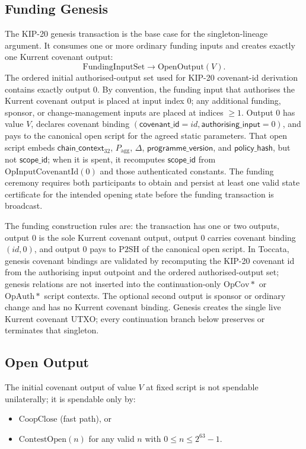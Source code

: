 \documentclass[10pt,a4paper]{article}
\begin{document}
\subsection{Funding Genesis}
The KIP-20 genesis transaction is the base case for the singleton-lineage argument. It consumes one or more ordinary funding inputs and creates exactly one Kurrent covenant output:
\[
  \mathrm{FundingInputSet} \longrightarrow \mathrm{OpenOutput}(V).
\]
The ordered initial authorised-output set used for KIP-20 covenant-id derivation contains exactly output 0. By convention, the funding input that authorises the Kurrent covenant output is placed at input index 0; any additional funding, sponsor, or change-management inputs are placed at indices $\ge 1$. Output 0 has value $V$, declares covenant binding $(\mathsf{covenant\_id}=id,\mathsf{authorising\_input}=0)$, and pays to the canonical open script for the agreed static parameters. That open script embeds $\mathsf{chain\_context}_{32}$, $P_{\mathrm{agg}}$, $\Delta$, $\mathsf{programme\_version}$, and $\mathsf{policy\_hash}$, but not $\mathsf{scope\_id}$; when it is spent, it recomputes $\mathsf{scope\_id}$ from $\mathrm{OpInputCovenantId}(0)$ and those authenticated constants. The funding ceremony requires both participants to obtain and persist at least one valid state certificate for the intended opening state before the funding transaction is broadcast.

The funding construction rules are: the transaction has one or two outputs, output 0 is the sole Kurrent covenant output, output 0 carries covenant binding $(id,0)$, and output 0 pays to $\mathrm{P2SH}$ of the canonical open script. In Toccata, genesis covenant bindings are validated by recomputing the KIP-20 covenant id from the authorising input outpoint and the ordered authorised-output set; genesis relations are not inserted into the continuation-only $\mathrm{OpCov*}$ or $\mathrm{OpAuth*}$ script contexts. The optional second output is sponsor or ordinary change and has no Kurrent covenant binding. Genesis creates the single live Kurrent covenant UTXO; every continuation branch below preserves or terminates that singleton.

\subsection{Open Output}
The initial covenant output of value $V$ at fixed script is not spendable unilaterally; it is spendable only by:
\begin{itemize}
  \item $\mathrm{CoopClose}$ (fast path), or
  \item $\mathrm{ContestOpen}(n)$ for any valid $n$ with $0 \le n \le 2^{63}-1$.
\end{itemize}
\end{document}
